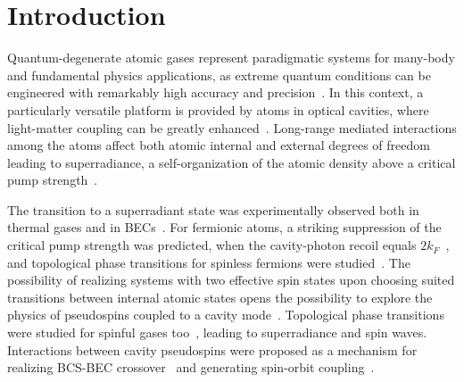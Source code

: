 \documentclass[pra,aps,superscriptaddress,twocolumn]{revtex4}
\begin{document}
\section{Introduction}
Quantum-degenerate atomic gases represent paradigmatic systems
for many-body and fundamental physics applications, as extreme quantum conditions
can be engineered with remarkably high accuracy and precision~\cite{RMPGiorginiStringari, Dalfovo, Dalibard}.
In this context, a particularly versatile platform is provided by atoms in optical cavities,
where light-matter coupling can be greatly enhanced~\cite{EsslingerReview, Vuletic2011}.
Long-range mediated interactions among the atoms affect both atomic internal and external degrees of freedom
leading to superradiance, a self-organization of the atomic density above a critical
pump strength~\cite{DomokosRitsch2002, Nagy2008, KBS2014, Sandner2015, maschlermekhov, MaschlerRitsch2005}.

The transition to a superradiant state was experimentally observed both in thermal gases and in
BECs~\cite{Wolke,Brenneke2007,Black2003,Baumann2010,Baumann2011,Esslinger12}. For fermionic atoms,
a striking suppression of the critical pump strength was predicted, when the cavity-photon recoil equals
$2k_F$~\cite{Piazza}, and topological phase transitions for spinless fermions were studied~\cite{Farokh2016}.
The possibility of realizing systems with two effective spin states upon choosing suited transitions between
internal atomic states opens the possibility to explore the physics of pseudospins coupled to
a cavity mode~\cite{Kimble}. Topological phase transitions were studied for spinful gases
too~\cite{Pan2015, Yu2018, Farokh2}, leading to superradiance and spin waves.
Interactions between cavity pseudospins were proposed as a mechanism for realizing
BCS-BEC crossover~\cite{Guo2012} and generating spin-orbit coupling~\cite{Deng2014, Yu2018}.
\end{document}
